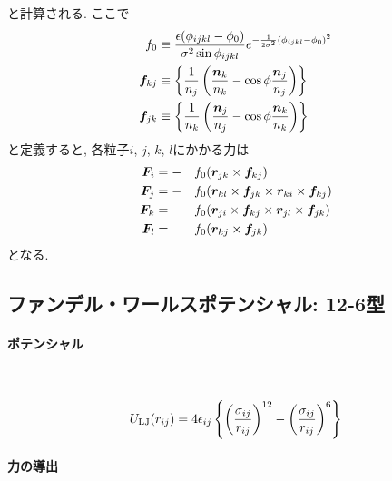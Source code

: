 と計算される. ここで
\begin{align}
   f_{0}
   &\equiv
   \frac{\epsilon(\phi_{ijkl} - \phi_{0})}{\sigma^{2} \sin \phi_{ijkl}}
   e^{-\frac{1}{2\sigma^{2}}(\phi_{ijkl} - \phi_{0})^{2}}
   \notag \\
   \bm{f}_{kj}
   &\equiv
   \left\{
      \frac{1}{n_{j}}
      \left(
             \frac{\bm{n}_{k}}{n_{k}} - \cos\phi \frac{\bm{n}_{j}}{n_{j}}
      \right)
   \right\}
   \notag \\
   \bm{f}_{jk}
   &\equiv
   \left\{
      \frac{1}{n_{k}}
      \left(
             \frac{\bm{n}_{j}}{n_{j}} - \cos\phi \frac{\bm{n}_{k}}{n_{k}}
      \right)
   \right\}
   \notag
\end{align}
と定義すると, 各粒子$i$, $j$, $k$, $l$にかかる力は
\begin{alignat}{3}
   \bm{F}_{i}
   &=
   -&&
   f_{0} (\bm{r}_{jk} \times \bm{f}_{kj})
   \notag \\
   \bm{F}_{j}
   &=
   -&&
   f_{0} (\bm{r}_{kl} \times \bm{f}_{jk} \times \bm{r}_{ki} \times \bm{f}_{kj})
   \notag \\
   \bm{F}_{k}
   &=&&
   f_{0} (\bm{r}_{ji} \times \bm{f}_{kj} \times \bm{r}_{jl} \times \bm{f}_{jk})
   \notag \\
   \bm{F}_{l}
   &=&&
   f_{0} (\bm{r}_{kj} \times \bm{f}_{jk})
   \notag
\end{alignat}
となる.

\clearpage
\subsection{ファンデル・ワールスポテンシャル: 12-6型}
\paragraph{ポテンシャル} \

\begin{align}
   U_{\mathrm{LJ}}(r_{ij})
 =
   4\epsilon_{ij}
   \left\{
           \left(\frac{\sigma_{ij}}{r_{ij}}\right)^{12}
          -\left(\frac{\sigma_{ij}}{r_{ij}}\right)^{6}
   \right\}
 \notag
\end{align}
\paragraph{力の導出} \

